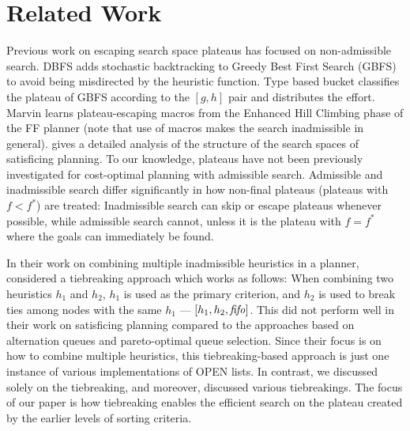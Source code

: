 
\section{Related Work}

Previous work on escaping search space plateaus has focused on
non-admissible search.  DBFS \cite{imai2011novel} %
adds stochastic backtracking to Greedy Best First Search (GBFS) to avoid
being misdirected by the heuristic function. Type based bucket
\cite{xie14type} classifies the plateau of GBFS according to the
$[g,h]$ pair and distributes the effort.  Marvin \cite{Coles07} learns plateau-escaping macros
from the Enhanced Hill Climbing phase of the FF planner
\cite{Hoffmann01} (note that use of macros makes the search inadmissible in general).
\citeauthor{Hoffmann05} \citeyear{Hoffmann05,Hoffmann11} gives a detailed analysis of the
structure of the search spaces of satisficing planning.
% 
To our knowledge, plateaus have not been previously investigated for cost-optimal planning with admissible search.
Admissible and inadmissible search differ significantly in how non-final plateaus (plateaus with $f < f^*$) are treated:
Inadmissible search can skip or escape plateaus whenever possible, while
admissible search cannot, unless it is the plateau with $f=f^*$ where the goals can immediately be found.

In their work on combining multiple inadmissible heuristics in a planner,
\citeauthor{RogerH10} \citeyear{RogerH10} considered a tiebreaking approach which works as follows:
When combining two heuristics $h_1$ and $h_2$, $h_1$ is used as the primary criterion,
and $h_2$ is used to break ties among nodes with the same $h_1$ --- $[h_1,h_2,{\text{\textit{fifo}}}]$.
This did not perform well in their work on satisficing planning compared to the approaches based on alternation queues and pareto-optimal queue selection.
% 
Since their focus is on how to combine multiple heuristics,
this tiebreaking-based approach is just one instance of various implementations of OPEN lists.
In contrast, we discussed solely on the tiebreaking, and moreover, discussed various tiebreakings.
The focus of our paper is how tiebreaking enables the efficient search on the plateau created by the earlier levels of sorting criteria.

